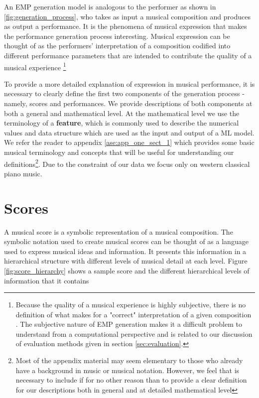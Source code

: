 An EMP generation model is analogous to the performer as shown in \ref{fig:generation_process}, who takes as input a musical composition and produces as output a performance. It is the phenomena of musical expression that makes the performance generation process interesting. Musical expression can be thought of as the performers' interpretation of a composition codified into different performance parameters that are intended to contribute the quality of a musical experience \footnote{Because the quality of a musical experience is highly subjective, there is no definition of what makes for a "correct" interpretation of a given composition \cite{cancino2018computational}. The subjective nature of EMP generation makes it a difficult problem to understand from a computational perspective and is related to our discussion of evaluation methods given in section \ref{sec:evaluation}. }

To provide a more detailed explanation of expression in musical performance, it is necessary to clearly define the first two components of the generation process - namely, scores and performances. We provide descriptions of both components at both a general and mathematical level. At the mathematical level we use the terminology of a \textbf{feature}, which is commonly used to describe the numerical values and data structure which are used as the input and output of a ML model. We refer the reader to appendix \ref{ase:app_one_sect_1} which provides some basic musical terminology and concepts that will be useful for understanding our definitions\footnote{Most of the appendix material may seem elementary to those who already have a background in music or musical notation. However, we feel that is necessary to include if for no other reason than to provide a clear definition for our descriptions both in general and at detailed mathematical level}. Due to the constraint of our data  we focus only on western classical piano music. 

\section{Scores}\label{sec:scores}
A musical score is a symbolic representation of a musical composition. The symbolic notation used to create musical scores can be thought of as a language used to express musical ideas and information.  It presents this information in a hierarchical structure with different levels of musical detail at each level. Figure \ref{fig:score_hierarchy} shows a sample score and the different hierarchical levels of information that it contains

